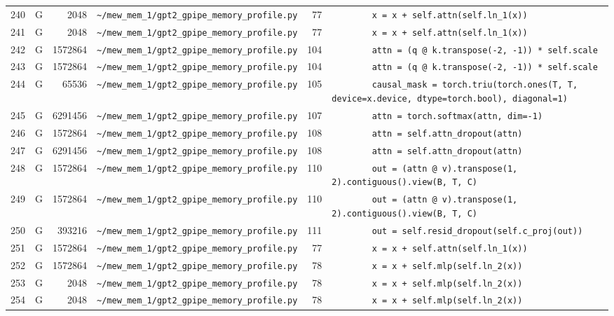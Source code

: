 \documentclass{article}
\begin{document}
\begin{longtable}{r l r p{6.5cm} r p{7.0cm}}
240 & G & 2048 & \lstinline|~/mew_mem_1/gpt2_gpipe_memory_profile.py| & 77 & \lstinline|        x = x + self.attn(self.ln_1(x))| \\
241 & G & 2048 & \lstinline|~/mew_mem_1/gpt2_gpipe_memory_profile.py| & 77 & \lstinline|        x = x + self.attn(self.ln_1(x))| \\
242 & G & 1572864 & \lstinline|~/mew_mem_1/gpt2_gpipe_memory_profile.py| & 104 & \lstinline|        attn = (q @ k.transpose(-2, -1)) * self.scale| \\
243 & G & 1572864 & \lstinline|~/mew_mem_1/gpt2_gpipe_memory_profile.py| & 104 & \lstinline|        attn = (q @ k.transpose(-2, -1)) * self.scale| \\
244 & G & 65536 & \lstinline|~/mew_mem_1/gpt2_gpipe_memory_profile.py| & 105 & \lstinline|        causal_mask = torch.triu(torch.ones(T, T, device=x.device, dtype=torch.bool), diagonal=1)| \\
245 & G & 6291456 & \lstinline|~/mew_mem_1/gpt2_gpipe_memory_profile.py| & 107 & \lstinline|        attn = torch.softmax(attn, dim=-1)| \\
246 & G & 1572864 & \lstinline|~/mew_mem_1/gpt2_gpipe_memory_profile.py| & 108 & \lstinline|        attn = self.attn_dropout(attn)| \\
247 & G & 6291456 & \lstinline|~/mew_mem_1/gpt2_gpipe_memory_profile.py| & 108 & \lstinline|        attn = self.attn_dropout(attn)| \\
248 & G & 1572864 & \lstinline|~/mew_mem_1/gpt2_gpipe_memory_profile.py| & 110 & \lstinline|        out = (attn @ v).transpose(1, 2).contiguous().view(B, T, C)| \\
249 & G & 1572864 & \lstinline|~/mew_mem_1/gpt2_gpipe_memory_profile.py| & 110 & \lstinline|        out = (attn @ v).transpose(1, 2).contiguous().view(B, T, C)| \\
250 & G & 393216 & \lstinline|~/mew_mem_1/gpt2_gpipe_memory_profile.py| & 111 & \lstinline|        out = self.resid_dropout(self.c_proj(out))| \\
251 & G & 1572864 & \lstinline|~/mew_mem_1/gpt2_gpipe_memory_profile.py| & 77 & \lstinline|        x = x + self.attn(self.ln_1(x))| \\
252 & G & 1572864 & \lstinline|~/mew_mem_1/gpt2_gpipe_memory_profile.py| & 78 & \lstinline|        x = x + self.mlp(self.ln_2(x))| \\
253 & G & 2048 & \lstinline|~/mew_mem_1/gpt2_gpipe_memory_profile.py| & 78 & \lstinline|        x = x + self.mlp(self.ln_2(x))| \\
254 & G & 2048 & \lstinline|~/mew_mem_1/gpt2_gpipe_memory_profile.py| & 78 & \lstinline|        x = x + self.mlp(self.ln_2(x))| \\

\end{longtable}
\end{document}
